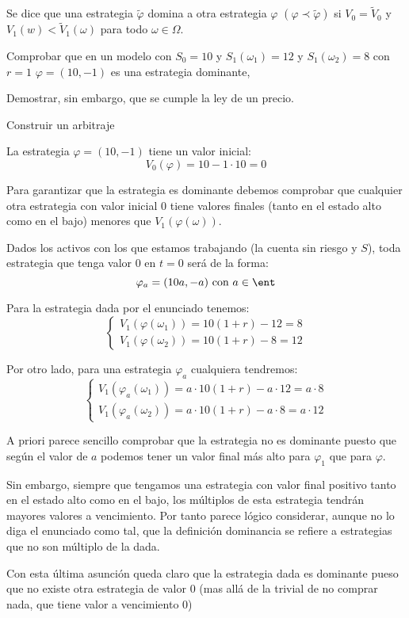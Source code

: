\begin{problem}[5]
Se dice que una estrategia $\tilde{\varphi}$ domina a otra estrategia $\varphi$ $(\varphi \prec \tilde{\varphi})$ si $V_0=\tilde{V}_0$ y $V_1(w) < \tilde{V}_1(ω)$ para todo $ω \in Ω$.

\ppart Comprobar que en un modelo con $S_0=10$ y $S_1(ω_1)=12$ y $S_1(ω_2) = 8$ con $r=1$ $\varphi=(10,-1)$ es una estrategia dominante,

\ppart Demostrar, sin embargo, que se cumple la ley de un precio.

\ppart Construir un arbitraje
\solution

\spart
{}

La estrategia $\varphi = (10,-1)$ tiene un valor inicial:
\[V_0(\varphi)=10-1\cdot 10 = 0\]

Para garantizar que la estrategia es dominante debemos comprobar que cualquier otra estrategia con valor inicial 0 tiene valores finales (tanto en el estado alto como en el bajo) menores que $V_1(\varphi(ω))$.

Dados los activos con los que estamos trabajando (la cuenta sin riesgo y $S$), toda estrategia que tenga valor 0 en $t=0$ será de la forma:
\[\varphi_a = (10a, -a) \text{ con } a \in \ent\]

Para la estrategia dada por el enunciado tenemos:
\[\left\{ \begin{array}{l}
V_1(\varphi(ω_1))= 10(1+r) -12  = 8\\
V_1(\varphi(ω_2))= 10(1+r) - 8 = 12
\end{array}\right.\]

Por otro lado, para una estrategia $\varphi_a$ cualquiera tendremos:
\[\left\{ \begin{array}{l}
V_1(\varphi_a(ω_1))= a\cdot 10(1+r) -a\cdot 12  = a\cdot 8\\
V_1(\varphi_a(ω_2))= a\cdot 10(1+r) - a\cdot 8 = a\cdot 12
\end{array}\right.\]

A priori parece sencillo comprobar que la estrategia no es dominante puesto que según el valor de $a$ podemos tener un valor final más alto para $\varphi_1$ que para $\varphi$.

Sin embargo, siempre que tengamos una estrategia con valor final positivo tanto en el estado alto como en el bajo, los múltiplos de esta estrategia tendrán mayores valores a vencimiento. Por tanto parece lógico considerar, aunque no lo diga el enunciado como tal, que la definición dominancia se refiere a estrategias que no son múltiplo de la dada.

Con esta última asunción queda claro que la estrategia dada es dominante pueso que no existe otra estrategia de valor $0$ (mas allá de la trivial de no comprar nada, que tiene valor a vencimiento $0$)

\spart



\end{problem}

